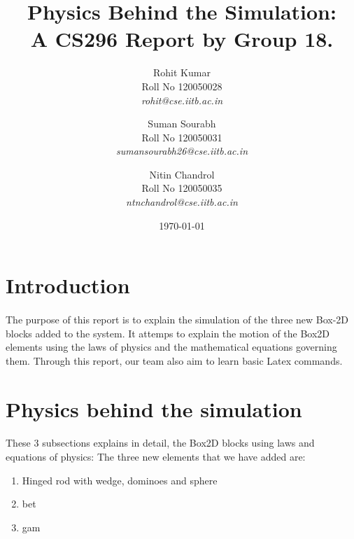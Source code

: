 \documentclass[11pt]{article}
\begin{document}
\title{Physics Behind the Simulation:\\
	A CS296 Report by Group 18.}
	
\author{Rohit Kumar \\
		\textup{Roll No 120050028} \\
		\textit{rohit@cse.iitb.ac.in}
	\and
	Suman Sourabh \\
	\textup{Roll No 120050031} \\
	\textit{sumansourabh26@cse.iitb.ac.in}
	\and
	Nitin Chandrol\\
	\textup{Roll No 120050035} \\
	\textit{ntnchandrol@cse.iitb.ac.in}
	}

\date{\today}

\maketitle

\section{Introduction}

	\paragraph{}
	The purpose of this report is to explain the simulation of the three new Box-2D\cite{box} blocks added to the system. It attemps to explain 
	the motion of the Box2D elements using the laws of physics and the mathematical equations governing them. Through this report, our team also
	aim to learn basic Latex commands\cite{andyroberts}. 
 
 
\section{Physics behind the simulation}
\paragraph{}
These 3 subsections explains in detail, the Box2D blocks using laws and equations of physics:
	The three new elements that we have added are:
	
	\begin{enumerate}
	\item Hinged rod with wedge, dominoes and sphere
	\item bet
	\item gam
	\end{enumerate}
\end{document}
